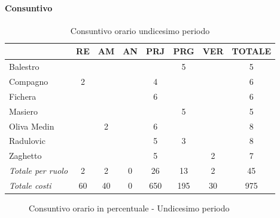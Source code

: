 \documentclass[a4paper,12pt]{article}
\begin{document}
            \paragraph{Consuntivo}
                \begin{table}[H]
                \centering
                \caption{Consuntivo orario undicesimo periodo}
                \begin{tabular}{|l|c|c|c|c|c|c|c|}
                \hline
                    \rowcolor{lightgray}{\textbf{Membro}} & {\textbf{RE}} & {\textbf{AM}} & {\textbf{AN}} & {\textbf{PRJ}} & {\textbf{PRG}} & {\textbf{VER}} & {\textbf{TOTALE}}\\
                \hline
                    Balestro & & & & & 5 & & 5\\
                \hline
                    Compagno & 2 & & & 4 & & & 6\\
                \hline
                    Fichera & & & & 6 & & & 6\\
                \hline
                    Masiero & & & & & 5 & & 5\\
                \hline
                    Oliva Medin & & 2 & & 6 & & & 8\\
                \hline
                    Radulovic & & & & 5 & 3 & & 8\\
                \hline
                    Zaghetto & & & & 5 & & 2 & 7\\
                \hline
                    \rowcolor{lightgray}\textit{Totale per ruolo} & 2 & 2 & 0 & 26 & 13 & 2 & 45\\
                \hline
                    \rowcolor{lightgray}\textit{Totale costi} & 60 & 40 & 0 & 650 & 195 & 30 & 975\\
                \hline
                \end{tabular}
                \end{table}

                \begin{figure}[H]
                \centering
                \caption{Consuntivo orario in percentuale - Undicesimo periodo}
                \end{figure}
                
\end{document}
